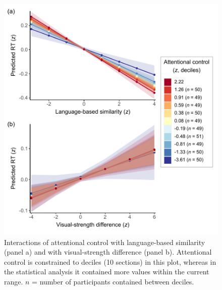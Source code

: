 \documentclass[
  12pt,
  man,floatsintext]{apa7}
\begin{document}
\begin{figure}

{\centering \includegraphics[width=0.85\linewidth]{../semanticpriming/frequentist_analysis/plots/semanticpriming-interactions-with-attentional-control} 

}

\caption{Interactions of attentional control with language-based similarity (panel a) and with visual-strength difference (panel b). Attentional control is constrained to deciles (10 sections) in this plot, whereas in the statistical analysis it contained more values within the current range. \(n\) = number of participants contained between deciles.}\label{fig:semanticpriming-interactions-with-attentional-control}
\end{figure}
\end{document}
